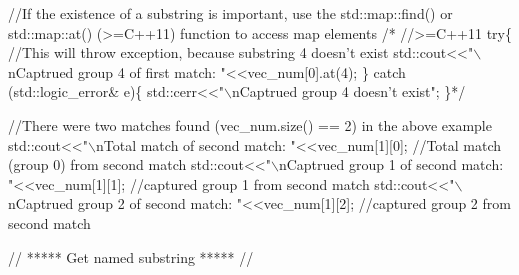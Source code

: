 \begin{DoxyCode}
\textcolor{comment}{//If the existence of a substring is important, use the std::map::find() or std::map::at() (>=C++11)
       function to access map elements}
\textcolor{comment}{/* //>=C++11}
\textcolor{comment}{try\{}
\textcolor{comment}{    //This will throw exception, because substring 4 doesn't exist}
\textcolor{comment}{    std::cout<<"\(\backslash\)nCaptrued group 4 of first match: "<<vec\_num[0].at(4);}
\textcolor{comment}{\} catch (std::logic\_error& e)\{}
\textcolor{comment}{    std::cerr<<"\(\backslash\)nCaptrued group 4 doesn't exist";}
\textcolor{comment}{\}*/}

\textcolor{comment}{//There were two matches found (vec\_num.size() == 2) in the above example}
std::cout<<\textcolor{stringliteral}{"\(\backslash\)nTotal match of second match: "}<<vec\_num[1][0];      \textcolor{comment}{//Total match (group 0) from second match}
std::cout<<\textcolor{stringliteral}{"\(\backslash\)nCaptrued group 1 of second match: "}<<vec\_num[1][1]; \textcolor{comment}{//captured group 1 from second match }
std::cout<<\textcolor{stringliteral}{"\(\backslash\)nCaptrued group 2 of second match: "}<<vec\_num[1][2]; \textcolor{comment}{//captured group 2 from second match}


\textcolor{comment}{// ***** Get named substring ***** //}


\end{DoxyCode}
